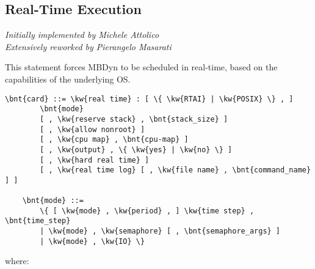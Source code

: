 \subsection{Real-Time Execution}\label{sec:REAL-TIME}
\emph{Initially implemented by Michele Attolico} \\
\emph{Extensively reworked by Pierangelo Masarati}

\noindent
This statement forces MBDyn to be scheduled in real-time,
based on the capabilities of the underlying OS.
\begin{Verbatim}[commandchars=\\\{\}]
    \bnt{card} ::= \kw{real time} : [ \{ \kw{RTAI} | \kw{POSIX} \} , ]
        \bnt{mode}
        [ , \kw{reserve stack} , \bnt{stack_size} ]
        [ , \kw{allow nonroot} ]
        [ , \kw{cpu map} , \bnt{cpu-map} ]
        [ , \kw{output} , \{ \kw{yes} | \kw{no} \} ]
        [ , \kw{hard real time} ]
        [ , \kw{real time log} [ , \kw{file name} , \bnt{command_name} ] ]

    \bnt{mode} ::=
        \{ [ \kw{mode} , \kw{period} , ] \kw{time step} , \bnt{time_step}
        | \kw{mode} , \kw{semaphore} [ , \bnt{semaphore_args} ]
        | \kw{mode} , \kw{IO} \}
\end{Verbatim}
where:
